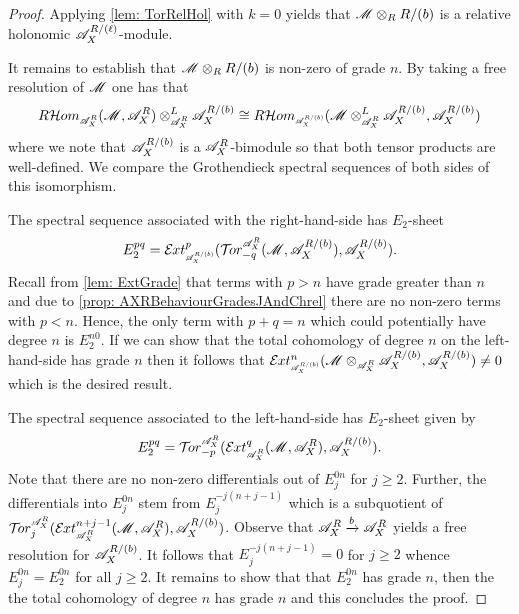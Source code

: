\begin{proof}
  Applying \cref{lem: TorRelHol} with $k=0$ yields that $\mathscr{M} \otimes_R R/(b)$ is a relative holonomic $\mathscr{A}_X^{R/(\ell)}$-module.

  It remains to establish that $\mathscr{M} \otimes_R R/(b)$ is non-zero of grade $n$.
  By taking a free resolution of $\mathscr{M}$ one has that
  $$R\Hom_{\scaleto{\A_X^R}{8pt}}(\M,\A_X^R)\otimes_{\scaleto{\A_X^R}{8pt}}^L \A_X^{R/(b)} \cong R \Hom_{\scaleto{\A_X^{R/(b)}}{8pt}}(\M\otimes_{\scaleto{\A_X^R}{8pt}}^L \A_X^{R/(b)}, \A_X^{R/(b)}) $$
  where we note that $\mathscr{A}_X^{R/(b)}$ is a $\mathscr{A}_X^{R}$-bimodule so that both tensor products are well-defined.
  We compare the Grothendieck spectral sequences of both sides of this isomorphism.

  The spectral sequence associated with the right-hand-side has $E_2$-sheet
  $$E^{pq}_2 = \Ex{\A_X^{R/(b)}}{p}(\Tr{\A_X^R}{-q}(\M, \A_X^{R/(b)}), \A_X^{R/(b)}).$$
  Recall from \cref{lem: ExtGrade} that terms with $p>n$ have grade greater than $n$ and due to \cref{prop: AXRBehaviourGradesJAndChrel} there are no non-zero terms with $p<n$.
  Hence, the only term with $p+q = n$ which could potentially have degree $n$ is $E^{n0}_2$.
  If we can show that the total cohomology of degree $n$ on the left-hand-side has grade $n$ then it follows that $\Ex{\A_X^{R/(b)}}{n}(\M\otimes_{\scaleto{\A_X^R}{8pt}} \A_X^{R/(b)}, \A_X^{R/(b)}) \neq 0$ which is the desired result.

  The spectral sequence associated to the left-hand-side has $E_2$-sheet given by
  $$E_2^{pq} =\Tr{\A_X^R}{-p}( \Ex{\A_X^R}{q}(\M,\A_X^R), \A_X^{R/(b)}).$$
  Note that there are no non-zero differentials out of $E_j^{0n}$ for $j\geq 2$.
  Further, the differentials into $E^{0n}_j$ stem from $E^{-j(n+j-1)}_j$ which is a subquotient of $\Tr{\A_X^R}{j}(\Ex{\A_X^R}{n+j-1}(\M,\ab \A_X^R)\ab , \A_X^{R/(b)})$.
  Observe that $\mathscr{A}_X^R \xrightarrow{b} \mathscr{A}_X^R $ yields a free resolution for $\mathscr{A}_X^{R/(b)}$.
  It follows that $E^{-j(n+j-1)}_j=0$ for $j\geq 2$ whence $E_j^{0n} = E_2^{0n}$ for all $j\geq 2$.
  It remains to show that that $E_2^{0n}$ has grade $n$, then the the total cohomology of degree $n$ has grade $n$ and this concludes the proof.


\end{proof}
